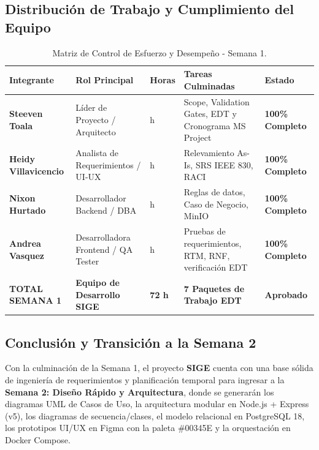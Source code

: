 \documentclass[12pt,a4paper]{article}
\begin{document}
\subsection{Distribución de Trabajo y Cumplimiento del Equipo}

\begin{table}[htbp]
\centering
\small
\begin{tabularx}{\textwidth}{|>{\hsize=0.7\hsize\bfseries}X|>{\hsize=1.0\hsize}X|>{\hsize=0.45\hsize\centering\arraybackslash}X|>{\hsize=1.2\hsize}X|>{\hsize=0.65\hsize\centering\arraybackslash}X|}
    \hline
    \rowcolor{tableheader}
    Integrante & Rol Principal & Horas & Tareas Culminadas & Estado \\
    \hline
    Steeven Toala & Líder de Proyecto / Arquitecto & 20 h & Scope, Validation Gates, EDT y Cronograma MS Project & \textbf{100\% Completo} \\
    \hline
    Heidy Villavicencio & Analista de Requerimientos / UI-UX & 18 h & Relevamiento As-Is, SRS IEEE 830, RACI & \textbf{100\% Completo} \\
    \hline
    Nixon Hurtado & Desarrollador Backend / DBA & 17 h & Reglas de datos, Caso de Negocio, MinIO & \textbf{100\% Completo} \\
    \hline
    Andrea Vasquez & Desarrolladora Frontend / QA Tester & 17 h & Pruebas de requerimientos, RTM, RNF, verificación EDT & \textbf{100\% Completo} \\
    \hline
    \rowcolor{gray!15}
    \textbf{TOTAL SEMANA 1} & \textbf{Equipo de Desarrollo SIGE} & \textbf{72 h} & \textbf{7 Paquetes de Trabajo EDT} & \textbf{Aprobado} \\
    \hline
\end{tabularx}
\caption{Matriz de Control de Esfuerzo y Desempeño - Semana 1.}
\label{tab:s1_08_esfuerzo}
\end{table}

\subsection{Conclusión y Transición a la Semana 2}
Con la culminación de la Semana 1, el proyecto \textbf{SIGE} cuenta con una base sólida de ingeniería de requerimientos y planificación temporal para ingresar a la \textbf{Semana 2: Diseño Rápido y Arquitectura}, donde se generarán los diagramas UML de Casos de Uso, la arquitectura modular en Node.js + Express (v5), los diagramas de secuencia/clases, el modelo relacional en PostgreSQL 18, los prototipos UI/UX en Figma con la paleta \#00345E y la orquestación en Docker Compose.
\end{document}
